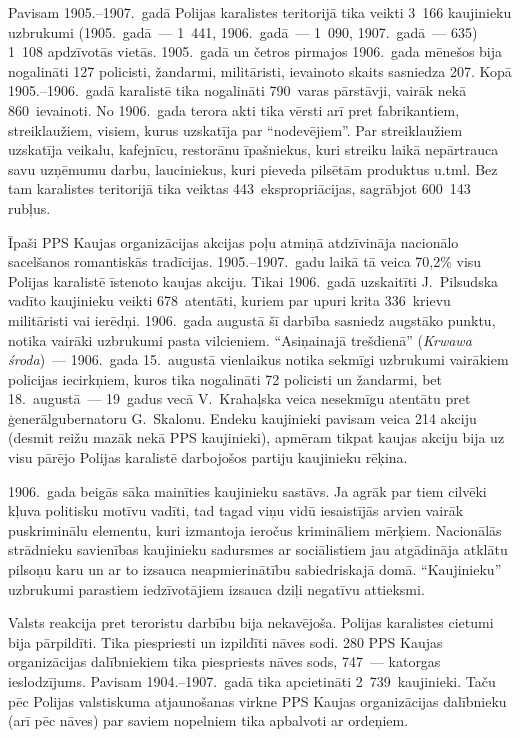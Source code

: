 \documentclass[twoside,a5paper,12pt,fleqn,openany]{extbook}
\newcommand{\pltxti}[1]{\textit{\textpolish{#1}}}
\begin{document}
Pavisam 1905.--1907.~gadā Polijas karalistes teritorijā tika veikti 3~166 kaujinieku uzbrukumi (1905.~gadā~--- 1~441, 1906.~gadā~--- 1~090, 1907.~gadā~--- 635) 1~108 apdzīvotās vietās. 1905.~gadā un četros pirmajos 1906.~gada mēnešos bija nogalināti 127 policisti, žandarmi, militāristi, ievainoto skaits sasniedza 207. Kopā 1905.--1906.~gadā karalistē tika nogalināti 790~varas pārstāvji, vairāk nekā 860~ievainoti. No 1906.~gada terora akti tika vērsti arī pret fabrikantiem, streiklaužiem, visiem, kurus uzskatīja par ``nodevējiem''. Par streiklaužiem uzskatīja veikalu, kafejnīcu, restorānu īpašniekus, kuri streiku laikā nepārtrauca savu uzņēmumu darbu, lauciniekus, kuri pieveda pilsētām produktus u.tml. Bez tam karalistes teritorijā tika veiktas 443~ekspropriācijas, sagrābjot 600~143 rubļus.

Īpaši PPS Kaujas organizācijas akcijas poļu atmiņā atdzīvināja nacionālo sacelšanos romantiskās tradīcijas. 1905.--1907.~gadu laikā tā veica 70,2\% visu Polijas karalistē īstenoto kaujas akciju. Tikai 1906.~gadā uzskaitīti J.~Pilsudska vadīto kaujinieku veikti 678~atentāti, kuriem par upuri krita 336~krievu militāristi vai ierēdņi. 1906.~gada augustā šī darbība sasniedz augstāko punktu, notika vairāki uzbrukumi pasta vilcieniem. ``Asiņainajā trešdienā'' (\pltxti{Krwawa środa})~--- 1906.~gada 15.~augustā vienlaikus notika sekmīgi uzbrukumi vairākiem policijas iecirkņiem, kuros tika nogalināti 72 policisti un žandarmi, bet 18.~augustā~--- 19~gadus vecā V.~Krahaļska veica nesekmīgu atentātu pret ģenerālgubernatoru G.~Skalonu. Endeku kaujinieki pavisam veica 214 akciju (desmit reižu mazāk nekā PPS kaujinieki), apmēram tikpat kaujas akciju bija uz visu pārējo Polijas karalistē darbojošos partiju kaujinieku rēķina.

1906.~gada beigās sāka mainīties kaujinieku sastāvs. Ja agrāk par tiem cilvēki kļuva politisku motīvu vadīti, tad tagad viņu vidū iesaistījās arvien vairāk puskriminālu elementu, kuri izmantoja ieročus krimināliem mērķiem. Nacionālās strādnieku savienības kaujinieku sadursmes ar sociālistiem jau atgādināja atklātu pilsoņu karu un ar to izsauca neapmierinātību sabiedriskajā domā. ``Kaujinieku'' uzbrukumi parastiem iedzīvotājiem izsauca dziļi negatīvu attieksmi.

Valsts reakcija pret teroristu darbību bija nekavējoša. Polijas karalistes cietumi bija pārpildīti. Tika piespriesti un izpildīti nāves sodi. 280 PPS Kaujas organizācijas dalībniekiem tika piespriests nāves sods, 747~--- katorgas ieslodzījums. Pavisam 1904.--1907.~gadā tika apcietināti 2~739~kaujinieki. Taču pēc Polijas valstiskuma atjaunošanas virkne PPS Kaujas organizācijas dalībnieku (arī pēc nāves) par saviem nopelniem tika apbalvoti ar ordeņiem.
\end{document}
